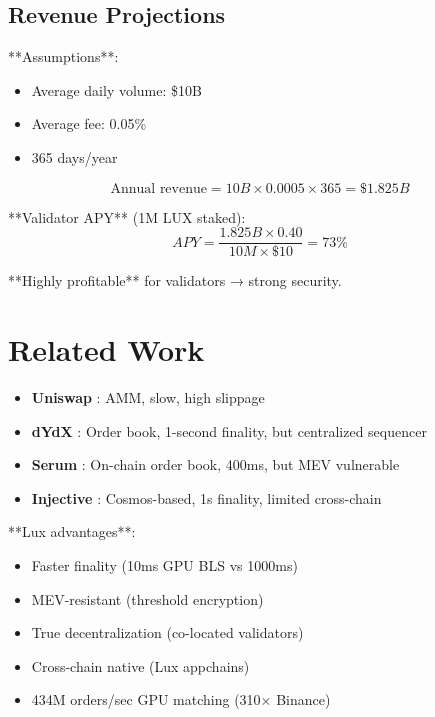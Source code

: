 \documentclass[11pt,letterpaper]{article}
\begin{document}
\subsection{Revenue Projections}

**Assumptions**:
\begin{itemize}
    \item Average daily volume: \$10B
    \item Average fee: 0.05\%
    \item 365 days/year
\end{itemize}

\begin{equation}
\text{Annual revenue} = 10B \times 0.0005 \times 365 = \$1.825B
\end{equation}

**Validator APY** (1M LUX staked):
\begin{equation}
APY = \frac{1.825B \times 0.40}{10M \times \$10} = 73\%
\end{equation}

**Highly profitable** for validators → strong security.

\section{Related Work}

\begin{itemize}
    \item \textbf{Uniswap} \cite{adams2020}: AMM, slow, high slippage
    \item \textbf{dYdX} \cite{dydx2021}: Order book, 1-second finality, but centralized sequencer
    \item \textbf{Serum} \cite{serum2020}: On-chain order book, 400ms, but MEV vulnerable
    \item \textbf{Injective} \cite{injective2021}: Cosmos-based, 1s finality, limited cross-chain
\end{itemize}

**Lux advantages**:
\begin{itemize}
    \item Faster finality (10ms GPU BLS vs 1000ms)
    \item MEV-resistant (threshold encryption)
    \item True decentralization (co-located validators)
    \item Cross-chain native (Lux appchains)
    \item 434M orders/sec GPU matching (310$\times$ Binance)
\end{itemize}
\end{document}
